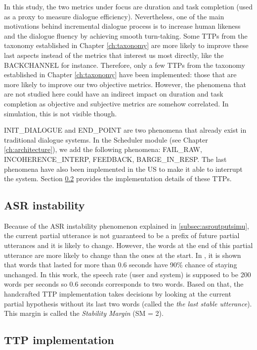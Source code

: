     In this study, the two metrics under focus are duration and task completion (used as a proxy to measure dialogue efficiency). Nevertheless, one of the main motivations behind incremental dialogue process is to increase human likeness and the dialogue fluency by achieving smooth turn-taking. Some TTPs from the taxonomy established in Chapter \ref{ch:taxonomy} are more likely to improve these last aspects instead of the metrics that interest us most directly, like the BACKCHANNEL for instance. Therefore, only a few TTPs from the taxonomy established in Chapter \ref{ch:taxonomy} have been implemented: those that are more likely to improve our two objective metrics. However, the phenomena that are not studied here could have an indirect impact on duration and task completion as objective and subjective metrics are somehow correlated. In simulation, this is not visible though.
    
    INIT\_DIALOGUE and END\_POINT are two phenomena that already exist in traditional dialogue systems. In the Scheduler module (see Chapter \ref{ch:architecture}), we add the following phenomena: FAIL\_RAW, INCOHERENCE\_INTERP, FEEDBACK, BARGE\_IN\_RESP. The last phenomena have also been implemented in the US to make it able to interrupt the system. Section \ref{subsec:ttpimpl} provides the implementation details of these TTPs.
    
    \subsection{ASR instability}
    \label{subsec:asrinstability}
    
    	Because of the ASR instability phenomenon explained in \ref{subsec:asroutputsimu}, the current partial utterance is not guaranteed to be a prefix of future partial utterances and it is likely to change. However, the words at the end of this partial utterance are more likely to change than the ones at the start. In \cite{McGraw2012}, it is shown that words that lasted for more than 0.6 seconds have 90\% chance of staying unchanged. In this work, the speech rate (user and system) is supposed to be 200 words per seconds \cite{Yuan2006} so 0.6 seconds corresponds to two words. Based on that, the handcrafted TTP implementation takes decisions by looking at the current partial hypothesis without its last two words (called the \textit{the last stable utterance}). This margin is called the \textit{Stability Margin} (SM = 2).
    
	\subsection{TTP implementation}
    \label{subsec:ttpimpl}
    
